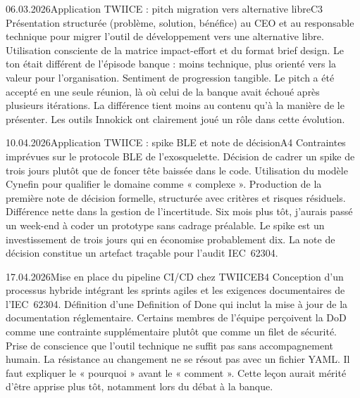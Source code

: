 \begin{jbentry}{06.03.2026}{Application TWIICE : pitch migration vers alternative libre}{C3}
\jbobs
Présentation structurée (problème, solution, bénéfice) au CEO et au responsable technique pour migrer l'outil de développement vers une alternative libre. Utilisation consciente de la matrice impact-effort et du format brief design. Le ton était différent de l'épisode banque : moins technique, plus orienté vers la valeur pour l'organisation.
\jbres
Sentiment de progression tangible. Le pitch a été accepté en une seule réunion, là où celui de la banque avait échoué après plusieurs itérations. La différence tient moins au contenu qu'à la manière de le présenter. Les outils Innokick ont clairement joué un rôle dans cette évolution.
\end{jbentry}

\begin{jbentry}{10.04.2026}{Application TWIICE : spike BLE et note de décision}{A4}
\jbobs
Contraintes imprévues sur le protocole BLE de l'exosquelette. Décision de cadrer un spike de trois jours plutôt que de foncer tête baissée dans le code. Utilisation du modèle Cynefin pour qualifier le domaine comme « complexe ». Production de la première note de décision formelle, structurée avec critères et risques résiduels.
\jbres
Différence nette dans la gestion de l'incertitude. Six mois plus tôt, j'aurais passé un week-end à coder un prototype sans cadrage préalable. Le spike est un investissement de trois jours qui en économise probablement dix. La note de décision constitue un artefact traçable pour l'audit IEC~62304.
\end{jbentry}

\begin{jbentry}{17.04.2026}{Mise en place du pipeline CI/CD chez TWIICE}{B4}
\jbobs
Conception d'un processus hybride intégrant les sprints agiles et les exigences documentaires de l'IEC~62304. Définition d'une Definition of Done qui inclut la mise à jour de la documentation réglementaire. Certains membres de l'équipe perçoivent la DoD comme une contrainte supplémentaire plutôt que comme un filet de sécurité.
\jbres
Prise de conscience que l'outil technique ne suffit pas sans accompagnement humain. La résistance au changement ne se résout pas avec un fichier YAML. Il faut expliquer le « pourquoi » avant le « comment ». Cette leçon aurait mérité d'être apprise plus tôt, notamment lors du débat à la banque.
\end{jbentry}


